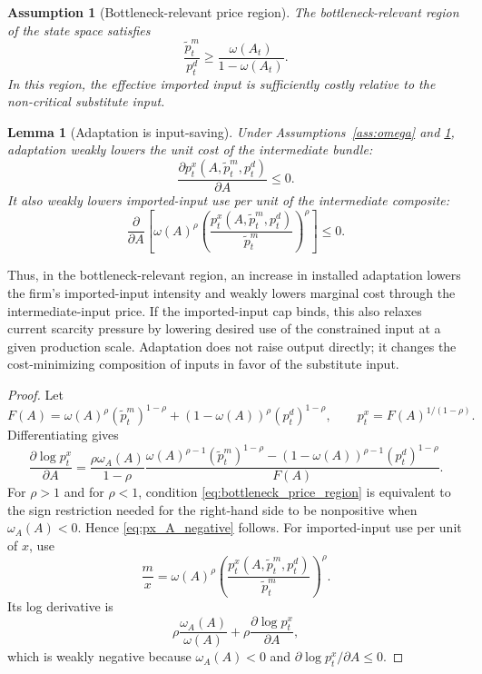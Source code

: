 ﻿\documentclass[12pt]{article}
\newtheorem{assumption}{Assumption}
\newtheorem{lemma}{Lemma}
\theoremstyle{remark}
\begin{document}
\begin{assumption}[Bottleneck-relevant price region]\label{ass:input_saving}
The bottleneck-relevant region of the state space satisfies
\begin{equation}
    \frac{\tilde p_t^m}{p_t^d}
    \ge
    \frac{\omega(A_t)}{1-\omega(A_t)}.
    \label{eq:bottleneck_price_region}
\end{equation}
In this region, the effective imported input is sufficiently costly relative to the non-critical
substitute input.
\end{assumption}

\begin{lemma}[Adaptation is input-saving]\label{lem:input_saving}
Under Assumptions~\ref{ass:omega} and \ref{ass:input_saving}, adaptation weakly lowers the unit
cost of the intermediate bundle:
\begin{equation}
    \frac{\partial p_t^x(A,\tilde p_t^m,p_t^d)}{\partial A}\le 0.
    \label{eq:px_A_negative}
\end{equation}
It also weakly lowers imported-input use per unit of the intermediate composite:
\begin{equation}
    \frac{\partial}{\partial A}
    \left[
        \omega(A)^\rho
        \left(\frac{p_t^x(A,\tilde p_t^m,p_t^d)}{\tilde p_t^m}\right)^\rho
    \right]
    \le 0.
    \label{eq:m_per_x_A_negative}
\end{equation}
\end{lemma}

Thus, in the bottleneck-relevant region, an increase in installed adaptation lowers the firm's
imported-input intensity and weakly lowers marginal cost through the intermediate-input price. If
the imported-input cap binds, this also relaxes current scarcity pressure by lowering desired use
of the constrained input at a given production scale. Adaptation does not raise output directly; it
changes the cost-minimizing composition of inputs in favor of the substitute input.

\begin{proof}
Let
\[
    F(A)
    =
    \omega(A)^\rho(\tilde p_t^m)^{1-\rho}
    +
    (1-\omega(A))^\rho(p_t^d)^{1-\rho},
    \qquad
    p_t^x=F(A)^{1/(1-\rho)}.
\]
Differentiating gives
\[
    \frac{\partial \log p_t^x}{\partial A}
    =
    \frac{\rho\omega_A(A)}{1-\rho}
    \frac{
        \omega(A)^{\rho-1}(\tilde p_t^m)^{1-\rho}
        -
        (1-\omega(A))^{\rho-1}(p_t^d)^{1-\rho}
    }{F(A)}.
\]
For $\rho>1$ and for $\rho<1$, condition \eqref{eq:bottleneck_price_region} is equivalent to the
sign restriction needed for the right-hand side to be nonpositive when $\omega_A(A)<0$. Hence
\eqref{eq:px_A_negative} follows. For imported-input use per unit of $x$, use
\[
    \frac{m}{x}
    =
    \omega(A)^\rho
    \left(\frac{p_t^x(A,\tilde p_t^m,p_t^d)}{\tilde p_t^m}\right)^\rho .
\]
Its log derivative is
\[
    \rho\frac{\omega_A(A)}{\omega(A)}
    +
    \rho\frac{\partial \log p_t^x}{\partial A},
\]
which is weakly negative because $\omega_A(A)<0$ and
$\partial \log p_t^x/\partial A\le 0$.
\end{proof}
\end{document}
